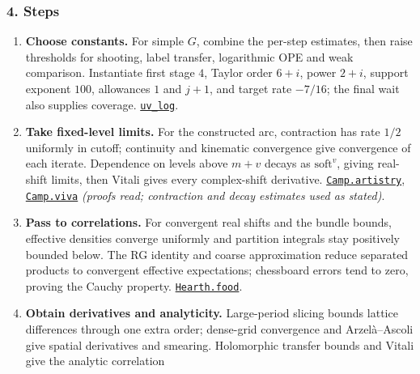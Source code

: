\documentclass[
  letterpaper,
  11pt]{article}
\providecommand{\tightlist}{%
  \setlength{\itemsep}{0pt}\setlength{\parskip}{0pt}}
\begin{document}
\subsubsection{4. Steps}\label{steps-15}

\begin{enumerate}
\def\labelenumi{\arabic{enumi}.}
\tightlist
\item
  \textbf{Choose constants.} For simple \(G\), combine the per-step
  estimates, then raise thresholds for shooting, label transfer,
  logarithmic OPE and weak comparison. Instantiate first stage \(4\),
  Taylor order \(6+i\), power \(2+i\), support exponent \(100\),
  allowances \(1\) and \(j+1\), and target rate \(-7/16\); the final
  wait also supplies coverage.
  \href{https://github.com/yang-mills-group/OpenAI-YM-20261028/blob/3456e5e75cf8d4cd558955a5c7638fba2d68f464/YM/SharpGram/Assembly/Flowers.lean\#L75-L130}{\texttt{uv\_log}}.
\item
  \textbf{Take fixed-level limits.} For the constructed arc, contraction
  has rate \(1/2\) uniformly in cutoff; continuity and kinematic
  convergence give convergence of each iterate. Dependence on levels
  above \(m+v\) decays as \(\mathrm{soft}^v\), giving real-shift limits,
  then Vitali gives every complex-shift derivative.
  \href{https://github.com/yang-mills-group/OpenAI-YM-20261028/blob/3456e5e75cf8d4cd558955a5c7638fba2d68f464/YM/UVExtension/Camp/Pear.lean\#L70-L71}{\texttt{Camp.artistry}},
  \href{https://github.com/yang-mills-group/OpenAI-YM-20261028/blob/3456e5e75cf8d4cd558955a5c7638fba2d68f464/YM/UVExtension/Camp/Veto.lean\#L64-L69}{\texttt{Camp.viva}}
  \emph{(proofs read; contraction and decay estimates used as stated)}.
\item
  \textbf{Pass to correlations.} For convergent real shifts and the
  bundle bounds, effective densities converge uniformly and partition
  integrals stay positively bounded below. The RG identity and coarse
  approximation reduce separated products to convergent effective
  expectations; chessboard errors tend to zero, proving the Cauchy
  property.
  \href{https://github.com/yang-mills-group/OpenAI-YM-20261028/blob/3456e5e75cf8d4cd558955a5c7638fba2d68f464/YM/UVExtension/Hearth/Table.lean\#L87-L112}{\texttt{Hearth.food}}.
\item
  \textbf{Obtain derivatives and analyticity.} Large-period slicing
  bounds lattice differences through one extra order; dense-grid
  convergence and Arzelà--Ascoli give spatial derivatives and smearing.
  Holomorphic transfer bounds and Vitali give the analytic correlation

\end{enumerate}
\end{document}

